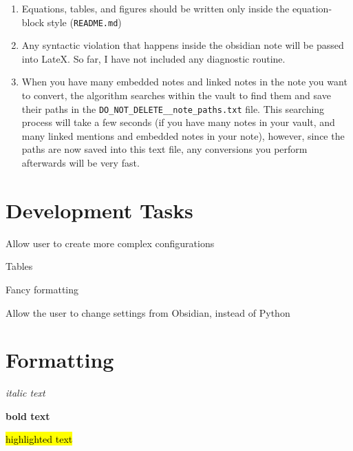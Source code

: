\begin{enumerate}
\item Equations, tables, and figures should be written only inside the equation-block style (\texttt{README.md})
\item Any syntactic violation that happens inside the obsidian note will be passed into LateX. So far, I have not included any diagnostic routine.
\item When you have many embedded notes and linked notes in the note you want to convert, the algorithm searches within the vault to find them and save their paths in the \texttt{DO\_NOT\_DELETE\_\_note\_paths.txt} file. This searching process will take a few seconds (if you have many notes in your vault, and many linked mentions and embedded notes in your note), however, since the paths are now saved into this text file, any conversions you perform afterwards will be very fast.
\end{enumerate}





\section{Development Tasks}


\begin{todolist}
\item Allow user to create more complex configurations
\item Tables
\begin{todolist}
\item Fancy formatting
\end{todolist}
\item Allow the user to change settings from Obsidian, instead of Python
\end{todolist}



\section{Formatting}




\textit{italic text}

\textbf{bold text}

\hl{highlighted text}

